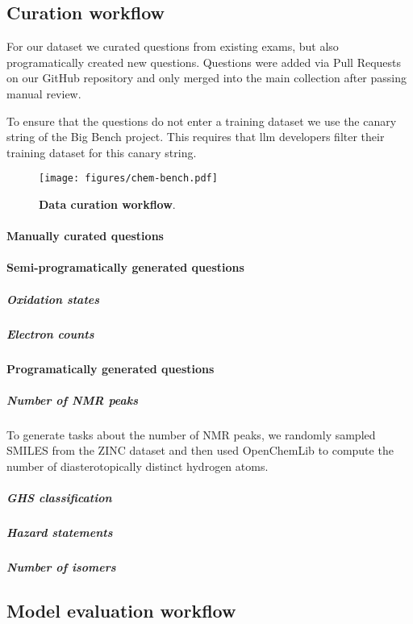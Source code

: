 \documentclass[11pt, oneside]{aastex631}
\begin{document}
\subsection{Curation workflow} \label{sec:curation}
For our dataset we curated questions from existing exams, but also programatically created new questions. Questions were added via Pull Requests on our GitHub repository and only merged into the main collection after passing manual review.

To ensure that the questions do not enter a training dataset we use the canary string of the Big Bench project. This requires that \Gls{llm} developers filter their training dataset for this canary string.  

\begin{figure}
    \texttt{[image: figures/chem-bench.pdf]}
        \caption{\textbf{Data curation workflow}.}
\end{figure}

\paragraph{Manually curated questions}

\paragraph{Semi-programatically generated questions}

\subparagraph{Oxidation states}

\subparagraph{Electron counts}

\paragraph{Programatically generated questions} 
\subparagraph{Number of NMR peaks} To generate tasks about the number of NMR peaks, we randomly sampled SMILES from the ZINC dataset and then used OpenChemLib\cite{openchemlib} to compute the number of diasterotopically distinct hydrogen atoms. 

\subparagraph{GHS classification}

\subparagraph{Hazard statements}

\subparagraph{Number of isomers}


\subsection{Model evaluation workflow}
\end{document}
